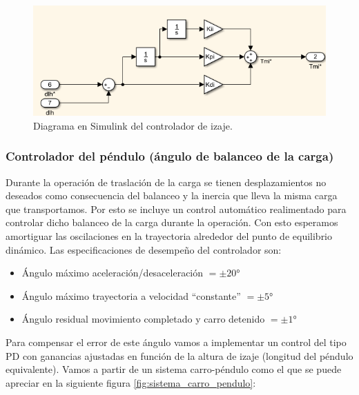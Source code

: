 \documentclass[11pt]{article}
\begin{document}
\begin{figure}[h!]
	\centering
	\includegraphics[width=1\textwidth]{images/imagen_13_controlador_izaje.png}
	\caption{Diagrama en Simulink del controlador de izaje.}
	\label{fig:controlador_izaje_simulink}
\end{figure}

\newpage

\subsubsection{Controlador del péndulo (ángulo de balanceo de la carga)}

Durante la operación de traslación de la carga se tienen desplazamientos no deseados como consecuencia del balanceo y la inercia que lleva la misma carga que transportamos. Por esto se incluye un control automático realimentado para controlar dicho balanceo de la carga durante la operación. Con esto esperamos amortiguar las oscilaciones en la trayectoria alrededor del punto de equilibrio dinámico. Las especificaciones de desempeño del controlador son:

\begin{itemize}
	\item Ángulo máximo aceleración/desaceleración $=\pm 20°$
	\item Ángulo máximo trayectoria a velocidad ``constante'' $=\pm 5°$
	\item Ángulo residual movimiento completado y carro detenido $=\pm 1°$
\end{itemize}

Para compensar el error de este ángulo vamos a implementar un control del tipo PD con ganancias ajustadas en función de la altura de izaje (longitud del péndulo equivalente). Vamos a partir de un sistema carro-péndulo como el que se puede apreciar en la siguiente figura \ref{fig:sistema_carro_pendulo}:
\end{document}
